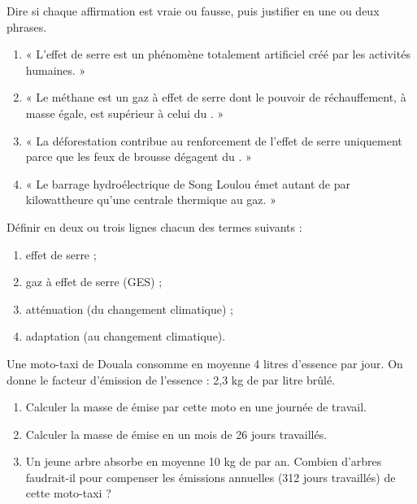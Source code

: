 \documentclass[11pt]{article}
\newcounter{popsec}
\newcounter{popsub}
\newcommand{\courssub}[1]{%
  \stepcounter{popsub}%
  \par\vspace{9pt}\noindent{\popxbold\fontsize{11.5}{13}\selectfont\color{popink}{\color{poporange}\thepopsec.\thepopsub}\hspace{6pt}#1}\par\nopagebreak\vspace{4pt}
}
\begin{document}
\begin{exercice}
Dire si chaque affirmation est vraie ou fausse, puis justifier en une ou deux phrases.
\begin{enumerate}
\item « L'effet de serre est un phénomène totalement artificiel créé par les activités humaines. »
\item « Le méthane est un gaz à effet de serre dont le pouvoir de réchauffement, à masse égale, est supérieur à celui du . »
\item « La déforestation contribue au renforcement de l'effet de serre uniquement parce que les feux de brousse dégagent du . »
\item « Le barrage hydroélectrique de Song Loulou émet autant de  par kilowattheure qu'une centrale thermique au gaz. »
\end{enumerate}
\end{exercice}

\begin{exercice}[Définitions]
Définir en deux ou trois lignes chacun des termes suivants :
\begin{enumerate}
\item effet de serre ;
\item gaz à effet de serre (GES) ;
\item atténuation (du changement climatique) ;
\item adaptation (au changement climatique).
\end{enumerate}
\end{exercice}

\begin{exercice}
Une moto-taxi de Douala consomme en moyenne 4 litres d'essence par jour. On donne le facteur d'émission de l'essence : 2,3 kg de  par litre brûlé.
\begin{enumerate}
\item Calculer la masse de  émise par cette moto en une journée de travail.
\item Calculer la masse de  émise en un mois de 26 jours travaillés.
\item Un jeune arbre absorbe en moyenne 10 kg de  par an. Combien d'arbres faudrait-il pour compenser les émissions annuelles (312 jours travaillés) de cette moto-taxi ?
\end{enumerate}
\end{exercice}

\courssub{Je m'entraîne}
\end{document}
